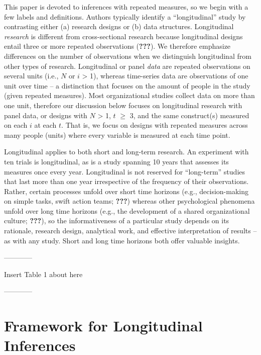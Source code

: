 \documentclass[english,,man]{apa6}
\begin{document}
This paper is devoted to inferences with repeated measures, so we begin with a few labels and definitions. Authors typically identify a \enquote{longitudinal} study by contrasting either (a) research designs or (b) data structures. Longitudinal \emph{research} is different from cross-sectional research because longitudinal designs entail three or more repeated observations ({\textbf{???}}). We therefore emphasize differences on the number of observations when we distinguish longitudinal from other types of research. Longitudinal or panel \emph{data} are repeated observations on several units (i.e., \(N\) or \(i\) \textgreater{} 1), whereas time-series data are observations of one unit over time -- a distinction that focuses on the amount of people in the study (given repeated measures). Most organizational studies collect data on more than one unit, therefore our discussion below focuses on longitudinal research with panel data, or designs with \(N\) \textgreater{} 1, \(t\) \(\geq\) 3, and the same construct(s) measured on each \(i\) at each \(t\). That is, we focus on designs with repeated measures across many people (units) where every variable is measured at each time point.

Longitudinal applies to both short and long-term research. An experiment with ten trials is longitudinal, as is a study spanning 10 years that assesses its measures once every year. Longitudinal is not reserved for \enquote{long-term} studies that last more than one year irrespective of the frequency of their observations. Rather, certain processes unfold over short time horizons (e.g., decision-making on simple tasks, swift action teams; {\textbf{???}}) whereas other psychological phenomena unfold over long time horizons (e.g., the development of a shared organizational culture; {\textbf{???}}), so the informativeness of a particular study depends on its rationale, research design, analytical work, and effective interpretation of results -- as with any study. Short and long time horizons both offer valuable insights.

\begin{center}

------------

Insert Table 1 about here

------------

\end{center}

\hypertarget{framework-for-longitudinal-inferences}{%
\section{Framework for Longitudinal Inferences}\label{framework-for-longitudinal-inferences}}
\end{document}
